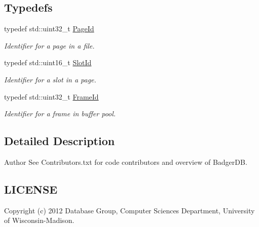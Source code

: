 \subsection*{Typedefs}
\begin{DoxyCompactItemize}
\item 
\hypertarget{namespacebadgerdb_a1f49e404293bf4240756b89b53b1587a}{typedef std\-::uint32\-\_\-t \hyperlink{namespacebadgerdb_a1f49e404293bf4240756b89b53b1587a}{Page\-Id}}\label{namespacebadgerdb_a1f49e404293bf4240756b89b53b1587a}

\begin{DoxyCompactList}\small\item\em Identifier for a page in a file. \end{DoxyCompactList}\item 
\hypertarget{namespacebadgerdb_afe9f2f985e7c67e04f76a16f7c4500c8}{typedef std\-::uint16\-\_\-t \hyperlink{namespacebadgerdb_afe9f2f985e7c67e04f76a16f7c4500c8}{Slot\-Id}}\label{namespacebadgerdb_afe9f2f985e7c67e04f76a16f7c4500c8}

\begin{DoxyCompactList}\small\item\em Identifier for a slot in a page. \end{DoxyCompactList}\item 
\hypertarget{namespacebadgerdb_a1e7378fbefaea050a47e6cde929e9c01}{typedef std\-::uint32\-\_\-t \hyperlink{namespacebadgerdb_a1e7378fbefaea050a47e6cde929e9c01}{Frame\-Id}}\label{namespacebadgerdb_a1e7378fbefaea050a47e6cde929e9c01}

\begin{DoxyCompactList}\small\item\em Identifier for a frame in buffer pool. \end{DoxyCompactList}\end{DoxyCompactItemize}


\subsection{Detailed Description}
\begin{DoxyAuthor}{Author}
See Contributors.\-txt for code contributors and overview of Badger\-D\-B.
\end{DoxyAuthor}
\hypertarget{namespacebadgerdb_LICENSE}{}\subsection{L\-I\-C\-E\-N\-S\-E}\label{namespacebadgerdb_LICENSE}
Copyright (c) 2012 Database Group, Computer Sciences Department, University of Wisconsin-\/\-Madison. 